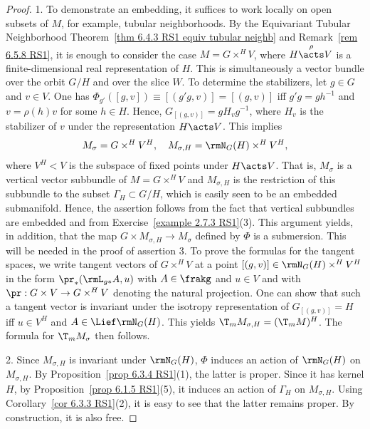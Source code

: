 \begin{proof}
    1. To demonstrate an embedding, it suffices to work locally on open subsets of $M$, for example, tubular neighborhoods. By the Equivariant Tubular Neighborhood Theorem~\ref{thm 6.4.3 RS1 equiv tubular neighb} and Remark~\ref{rem 6.5.8 RS1}, it is enough to consider the case $M=G\times^H V$, where $H\overset{\rho}{\acts} V$ is a finite-dimensional real representation of $H$. This is simultaneously a vector bundle over the orbit $G\slash H$ and over the slice $W$. To determine the stabilizers, let $g\in G$ and $v\in V$. One has $\Phi_{g'}\left([g,v]\right)\equiv [(g'g,v)]=[(g,v)]$ iff $g'g=gh^{-1}$ and $v=\rho(h)v$ for some $h\in H$. 
    Hence,  $G_{[(g,v)]}=gH_v g^{-1}$, where $H_v$ is the stabilizer of $v$ under the representation $H\acts V$. This implies 
    \[M_\sigma=G\times^H V^H,\quad M_{\sigma, H}=\rmN_G(H)\times^H V^H,\]
    where $V^H< V$ is the subspace of fixed points under $H\acts V$. That is, $M_\sigma$ is a vertical vector subbundle of $M=G\times^H V$ and $M_{\sigma,H}$ is the restriction of this subbundle to the subset $\Gamma_H\subset G\slash H$, which is easily seen to be an embedded submanifold. Hence, the assertion follows from the fact that vertical subbundles are embedded and from Exercise~\ref{example 2.7.3 RS1}(3). This argument yields, in addition, that the map $G\times M_{\sigma, H}\to M_\sigma$ defined by $\Phi$ is a submersion. This will be needed in the proof of assertion 3. To prove the formulas for the tangent spaces, we write tangent vectors of $G\times^H V$ at a point $[(g,v)]\in \rmN_G(H)\times^H V^H$ in the form $\pr_\ast(\rmL_{g\ast}A,u)$ with $A\in\frakg$ and $u\in V$ and with $\pr:G\times V\to G\times^H V$ denoting the natural projection. One can show that such a tangent vector is invariant under the isotropy representation of $G_{[(g,v)]}=H$ iff $u\in V^H$ and $A\in \Lief\rmN_G(H)$. This yields $\T_m M_{\sigma,H}=(\T_m M)^H$. The formula for $\T_m M_\sigma$ then follows.

    2. Since $M_{\sigma,H}$ is invariant under $\rmN_G(H)$, $\Phi$ induces an action of $\rmN_G(H)$ on $M_{\sigma,H}$. By Proposition~\ref{prop 6.3.4 RS1}(1), the latter is proper. Since it has kernel $H$, by Proposition~\ref{prop 6.1.5 RS1}(5), it induces an action of $\Gamma_H$ on $M_{\sigma, H}$. Using Corollary~\ref{cor 6.3.3 RS1}(2), it is easy to see that the latter remains proper. By construction, it is also free.


\end{proof}
